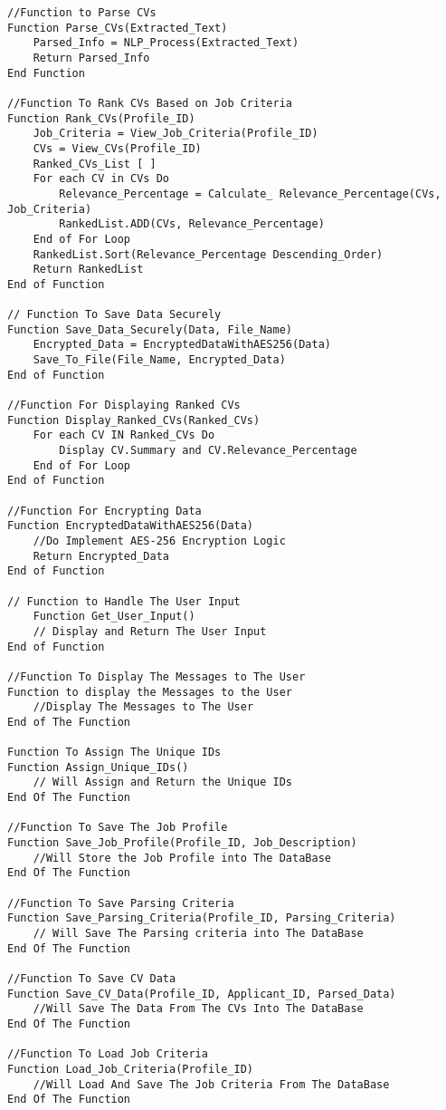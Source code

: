 \begin{lstlisting}[language=pseudocode, caption={Pseudocode for the CV Analyser}]
//Function to Parse CVs
Function Parse_CVs(Extracted_Text)
    Parsed_Info = NLP_Process(Extracted_Text)
    Return Parsed_Info
End Function

//Function To Rank CVs Based on Job Criteria
Function Rank_CVs(Profile_ID)
    Job_Criteria = View_Job_Criteria(Profile_ID)
    CVs = View_CVs(Profile_ID)
    Ranked_CVs_List [ ]
    For each CV in CVs Do
        Relevance_Percentage = Calculate_ Relevance_Percentage(CVs, Job_Criteria)
        RankedList.ADD(CVs, Relevance_Percentage)
    End of For Loop
    RankedList.Sort(Relevance_Percentage Descending_Order)
    Return RankedList
End of Function

// Function To Save Data Securely
Function Save_Data_Securely(Data, File_Name)
    Encrypted_Data = EncryptedDataWithAES256(Data)
    Save_To_File(File_Name, Encrypted_Data)
End of Function

//Function For Displaying Ranked CVs
Function Display_Ranked_CVs(Ranked_CVs)
    For each CV IN Ranked_CVs Do
        Display CV.Summary and CV.Relevance_Percentage
    End of For Loop
End of Function

//Function For Encrypting Data
Function EncryptedDataWithAES256(Data)
    //Do Implement AES-256 Encryption Logic
    Return Encrypted_Data
End of Function

// Function to Handle The User Input
    Function Get_User_Input()
    // Display and Return The User Input
End of Function

//Function To Display The Messages to The User
Function to display the Messages to the User
    //Display The Messages to The User
End of The Function 

Function To Assign The Unique IDs
Function Assign_Unique_IDs()
    // Will Assign and Return the Unique IDs
End Of The Function

//Function To Save The Job Profile
Function Save_Job_Profile(Profile_ID, Job_Description)
    //Will Store the Job Profile into The DataBase
End Of The Function

//Function To Save Parsing Criteria
Function Save_Parsing_Criteria(Profile_ID, Parsing_Criteria)
    // Will Save The Parsing criteria into The DataBase
End Of The Function

//Function To Save CV Data
Function Save_CV_Data(Profile_ID, Applicant_ID, Parsed_Data)
    //Will Save The Data From The CVs Into The DataBase
End Of The Function

//Function To Load Job Criteria
Function Load_Job_Criteria(Profile_ID)
    //Will Load And Save The Job Criteria From The DataBase
End Of The Function


\end{lstlisting}
